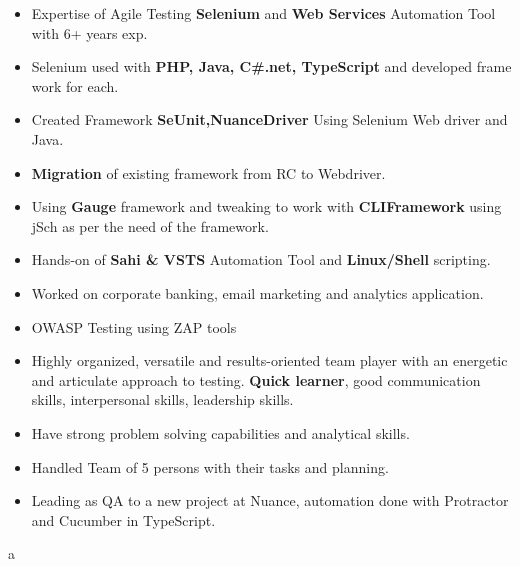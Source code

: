 

\begin{cvparagraph}

\begin{itemize}
 \item {Expertise of Agile Testing \textbf{Selenium} and \textbf{Web Services} Automation Tool with 6+ years exp.}

 \item {Selenium used with \textbf{PHP, Java, C\#.net, TypeScript} and developed frame work for each.}

 \item {Created Framework \textbf{SeUnit,NuanceDriver} Using Selenium Web driver and Java.}

 \item {\textbf{Migration} of existing framework from RC to Webdriver.}

 \item {Using \textbf{Gauge} framework and tweaking to work with \textbf{CLIFramework} using jSch as per the need of the framework.}

 \item {Hands-on of \textbf{Sahi \& VSTS} Automation Tool and \textbf{Linux/Shell} scripting.}

 \item {Worked on corporate banking, email marketing and analytics application.}

 \item {OWASP Testing using ZAP tools}

 \item {Highly organized, versatile and results-oriented team player with an energetic and articulate approach to testing. \textbf{Quick learner}, good communication skills, interpersonal skills, leadership skills.}

 \item {Have strong problem solving capabilities and analytical skills.}

 \item {Handled Team of 5 persons with their tasks and planning.}
 
 \item {Leading as QA to a new project at Nuance, automation done with Protractor and Cucumber in TypeScript.}
\end{itemize}
\end{cvparagraph}
a